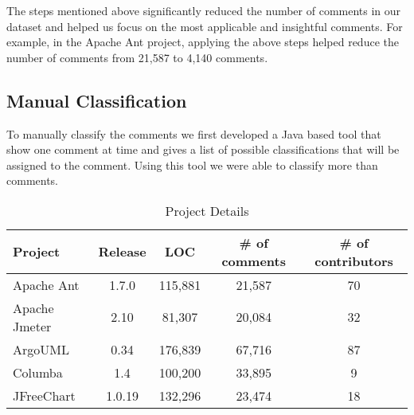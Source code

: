 The steps mentioned above significantly reduced the number of comments in our dataset and helped us focus on the most applicable and insightful comments. For example, in the Apache Ant project, applying the above steps helped reduce the number of comments from 21,587 to 4,140 comments.


\subsection{Manual Classification} %
\label{sub:manual_classification}

To manually classify the comments we first developed a Java based tool that show one comment at time and gives a list of possible classifications that will be assigned to the comment. Using this tool we were able to classify more than  comments. 


\begin{table*}[!hbt]
      \begin{center}
            \caption{Project Details}
            \label{tab:project_details}
            \begin{tabular}{l| c c c c }
            \toprule
            \textbf{Project}   & \textbf{Release}          & \textbf{LOC}     & \textbf{\# of comments} & \textbf{\# of contributors} \\ \midrule 
              Apache Ant       & 1.7.0                     & 115,881          & 21,587                                & 70  \\                                   
              Apache Jmeter    & 2.10                      & 81,307           & 20,084                                & 32  \\                                   
              ArgoUML          & 0.34                      & 176,839          & 67,716                                & 87  \\                                   
              Columba          & 1.4                       & 100,200          & 33,895                                & 9   \\                                   
              JFreeChart       & 1.0.19                    & 132,296          & 23,474                                & 18  \\ \bottomrule
            \end{tabular}
      \end{center}
\end{table*}
